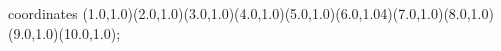 					coordinates { (1.0,1.0)(2.0,1.0)(3.0,1.0)(4.0,1.0)(5.0,1.0)(6.0,1.04)(7.0,1.0)(8.0,1.0)(9.0,1.0)(10.0,1.0)};